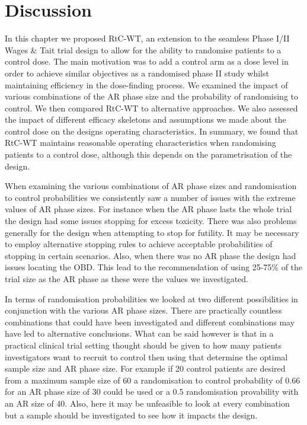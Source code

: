  \section{Discussion}
 \label{WT:Discussion}

In this chapter we proposed RtC-WT, an extension to the seamless Phase \RN{1}/\RN{2} Wages \& Tait trial design to allow for the ability to randomise patients to a control dose. The main motivation was to add a control arm as a dose level in order to achieve similar objectives as a randomised phase \RN{2} study whilst maintaining efficiency in the dose-finding process. We examined the impact of various combinations of the AR phase size and the probability of randomising to control. We then compared RtC-WT to alternative approaches. We also assessed the impact of different efficacy skeletons and assumptions we made about the control dose on the designs operating characteristics. In summary, we found that RtC-WT maintains reasonable operating characteristics when randomising patients to a control dose, although this depends on the parametrisation of the design.   

When examining the various combinations of AR phase sizes and randomisation to control probabilities we consistently saw a number of issues with the extreme values of AR phase sizes. For instance when the AR phase lasts the whole trial the design had some issues stopping for excess toxicity. There was also problems generally for the design when attempting to stop for futility. It may be necessary to employ alternative stopping rules to achieve acceptable probabilities of stopping in certain scenarios. Also, when there was no AR phase the design had issues locating the OBD. This lead to the recommendation of using 25-75\% of the trial size as the AR phase as these were the values we investigated. 

In terms of randomisation probabilities we looked at two different possibilities in conjunction with the various AR phase sizes. There are practically countless combinations that could have been investigated and different combinations may have led to alternative conclusions. What can be said however is that in a practical clinical trial setting thought should be given to how many patients investigators want to recruit to control then using that determine the optimal sample size and AR phase size. For example if 20 control patients are desired from a maximum sample size of 60 a randomisation to control probability of 0.66 for an AR phase size of 30 could be used or a 0.5 randomisation provability with an AR size of 40. Also, here it may be unfeasible to look at every combination but a sample should be investigated to see how it impacts the design. 

